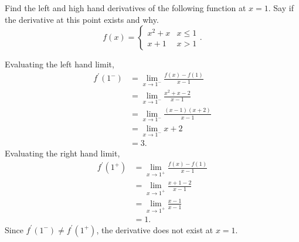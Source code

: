 \begin{example}
	Find the left and high hand derivatives of the following function at $x=1$.
	Say if the derivative at this point exists and why.
	\begin{equation*}
		f(x) = \begin{cases}
			x^2 + x & x \leq 1 \\
			x+1 & x > 1
		\end{cases}.
	\end{equation*}
\end{example}
Evaluating the left hand limit,
\begin{align*}
	f^\prime(1^-) &= \lim_{x \to 1^-}{\frac{f(x)-f(1)}{x-1}} \\
	&= \lim_{x \to 1^-}{\frac{x^2 + x - 2}{x-1}} \\
	&= \lim_{x \to 1^-}{\frac{(x-1)(x+2)}{x-1}} \\
	&= \lim_{x \to 1^-}{x+2} \\
	&= 3.
\end{align*}
\indent
Evaluating the right hand limit,
\begin{align*}
	f^\prime(1^+) &= \lim_{x \to 1^+}{\frac{f(x)-f(1)}{x-1}} \\
	&= \lim_{x \to 1^+}{\frac{x + 1 - 2}{x-1}} \\
	&= \lim_{x \to 1^+}{\frac{x-1}{x-1}} \\
	&= 1.
\end{align*}
\indent
Since $f^\prime(1^-) \neq f^\prime(1^+)$, the derivative does not exist at $x=1$.